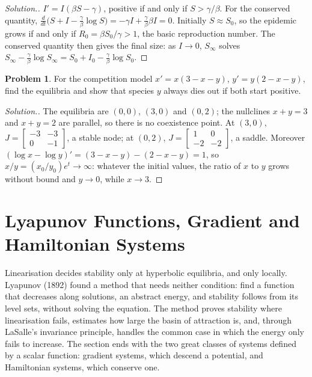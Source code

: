 \documentclass[11pt,a4paper]{article}
\numberwithin{equation}{section}
\theoremstyle{definition}
\newtheorem{problemx}{Problem}[subsection]
\newenvironment{problem}{\begin{problemx}}{\end{problemx}}
\newenvironment{solution}
  {\renewcommand{\qedsymbol}{}\begin{proof}[\textit{Solution}.]}
  {\end{proof}}
\begin{document}
\begin{solution}
$I' = I(\beta S - \gamma)$, positive if and only if $S > \gamma/\beta$. For the conserved quantity, $\frac{d}{dt}\bigl(S + I - \frac\gamma\beta\log S\bigr) = -\gamma I + \frac\gamma\beta\beta I = 0$. Initially $S \approx S_0$, so the epidemic grows if and only if
$R_0 = \beta S_0/\gamma > 1$, the basic reproduction number. The conserved quantity then gives the final size: as $I \to 0$, $S_\infty$ solves $S_\infty - \frac\gamma\beta\log S_\infty = S_0 + I_0 - \frac\gamma\beta\log S_0$.
\end{solution}

\begin{problem}
For the competition model $x' = x(3 - x - y)$, $y' = y(2 - x - y)$, find the equilibria and show that species $y$ always dies out if both start positive.
\end{problem}

\begin{solution}
The equilibria are $(0, 0)$, $(3, 0)$ and $(0, 2)$; the nullclines $x + y = 3$ and $x + y = 2$ are parallel, so there is no coexistence point. At $(3, 0)$, $J = \begin{bmatrix} -3 & -3\\ 0 & -1\end{bmatrix}$, a stable node; at $(0, 2)$,
$J = \begin{bmatrix} 1 & 0\\ -2 & -2\end{bmatrix}$, a saddle. Moreover $(\log x - \log y)' = (3 - x - y) - (2 - x - y) = 1$, so $x/y = (x_0/y_0)e^t \to \infty$: whatever the initial values, the ratio of $x$ to $y$ grows without bound and
$y \to 0$, while $x \to 3$.
\end{solution}

\section{Lyapunov Functions, Gradient and Hamiltonian Systems}
\label{sec:lyapunov}

Linearisation decides stability only at hyperbolic equilibria, and only locally. Lyapunov (1892) found a method that needs neither condition: find a
function that decreases along solutions, an abstract energy, and stability follows from its level sets, without solving the equation. The method
proves stability where linearisation fails, estimates how large the basin of attraction is, and, through LaSalle's invariance principle, handles
the common case in which the energy only fails to increase. The section ends with the two great classes of systems defined by a scalar function:
gradient systems, which descend a potential, and Hamiltonian systems, which conserve one.
\end{document}
